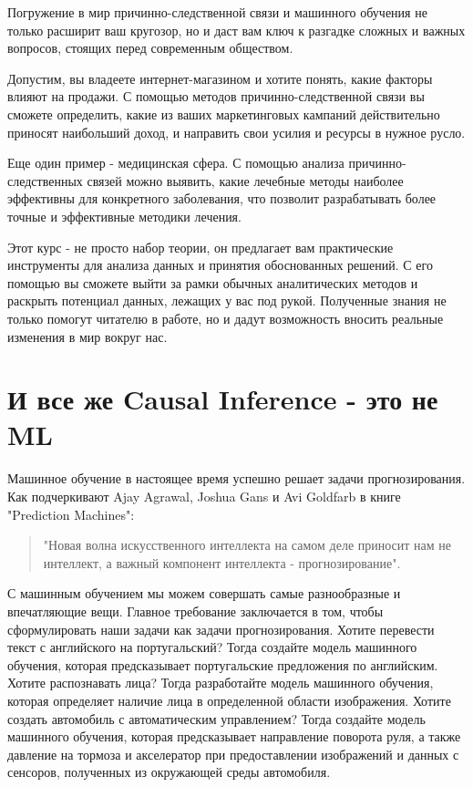 \documentclass{article}
\begin{document}
        \newpage

        Погружение в мир причинно-следственной связи и машинного обучения не только расширит ваш кругозор, но и даст вам ключ к разгадке сложных и важных вопросов, стоящих перед современным обществом.

        Допустим, вы владеете интернет-магазином и хотите понять, какие факторы влияют на продажи. С помощью методов причинно-следственной связи вы сможете определить, какие из ваших маркетинговых кампаний действительно приносят наибольший доход, и направить свои усилия и ресурсы в нужное русло.

        Еще один пример - медицинская сфера. С помощью анализа причинно-следственных связей можно выявить, какие лечебные методы наиболее эффективны для конкретного заболевания, что позволит разрабатывать более точные и эффективные методики лечения.

        Этот курс - не просто набор теории, он предлагает вам практические инструменты для анализа данных и принятия обоснованных решений. С его помощью вы сможете выйти за рамки обычных аналитических методов и раскрыть потенциал данных, лежащих у вас под рукой. Полученные знания не только помогут читателю в работе, но и дадут возможность вносить реальные изменения в мир вокруг нас.

    \section*{И все же Causal Inference - это не ML}
        Машинное обучение в настоящее время успешно решает задачи прогнозирования. Как подчеркивают Ajay Agrawal, Joshua Gans и Avi Goldfarb в книге "Prediction Machines":

        \begin{quote}
            "Новая волна искусственного интеллекта на самом деле приносит нам не интеллект, а важный компонент интеллекта - прогнозирование".
        \end{quote}

        С машинным обучением мы можем совершать самые разнообразные и впечатляющие вещи. Главное требование заключается в том, чтобы сформулировать наши задачи как задачи прогнозирования. Хотите перевести текст с английского на португальский? Тогда создайте модель машинного обучения, которая предсказывает португальские предложения по английским. Хотите распознавать лица? Тогда разработайте модель машинного обучения, которая определяет наличие лица в определенной области изображения. Хотите создать автомобиль с автоматическим управлением? Тогда создайте модель машинного обучения, которая предсказывает направление поворота руля, а также давление на тормоза и акселератор при предоставлении изображений и данных с сенсоров, полученных из окружающей среды автомобиля.
\end{document}
